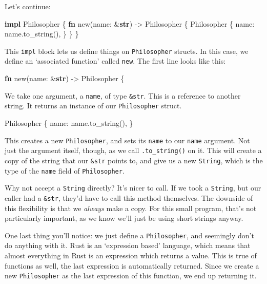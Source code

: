 \documentclass[a4paper,]{book}
\newenvironment{Shaded}{\begin{snugshade}}{\end{snugshade}}
\newcommand{\KeywordTok}[1]{\textcolor[rgb]{0.13,0.29,0.53}{\textbf{{#1}}}}
\newcommand{\NormalTok}[1]{{#1}}
\begin{document}
Let's continue:

\begin{Shaded}
\begin{Highlighting}[]
\KeywordTok{impl} \NormalTok{Philosopher \{}
    \KeywordTok{fn} \NormalTok{new(name: &}\KeywordTok{str}\NormalTok{) -> Philosopher \{}
        \NormalTok{Philosopher \{}
            \NormalTok{name: name.to_string(),}
        \NormalTok{\}}
    \NormalTok{\}}
\NormalTok{\}}
\end{Highlighting}
\end{Shaded}

This \texttt{impl} block lets us define things on \texttt{Philosopher}
structs. In this case, we define an `associated function' called
\texttt{new}. The first line looks like this:

\begin{Shaded}
\begin{Highlighting}[]
\KeywordTok{fn} \NormalTok{new(name: &}\KeywordTok{str}\NormalTok{) -> Philosopher \{}
\end{Highlighting}
\end{Shaded}

We take one argument, a \texttt{name}, of type \texttt{\&str}. This is a
reference to another string. It returns an instance of our
\texttt{Philosopher} struct.

\begin{Shaded}
\begin{Highlighting}[]
\NormalTok{Philosopher \{}
    \NormalTok{name: name.to_string(),}
\NormalTok{\}}
\end{Highlighting}
\end{Shaded}

This creates a new \texttt{Philosopher}, and sets its \texttt{name} to
our \texttt{name} argument. Not just the argument itself, though, as we
call \texttt{.to\_string()} on it. This will create a copy of the string
that our \texttt{\&str} points to, and give us a new \texttt{String},
which is the type of the \texttt{name} field of \texttt{Philosopher}.

Why not accept a \texttt{String} directly? It's nicer to call. If we
took a \texttt{String}, but our caller had a \texttt{\&str}, they'd have
to call this method themselves. The downside of this flexibility is that
we \emph{always} make a copy. For this small program, that's not
particularly important, as we know we'll just be using short strings
anyway.

One last thing you'll notice: we just define a \texttt{Philosopher}, and
seemingly don't do anything with it. Rust is an `expression based'
language, which means that almost everything in Rust is an expression
which returns a value. This is true of functions as well, the last
expression is automatically returned. Since we create a new
\texttt{Philosopher} as the last expression of this function, we end up
returning it.
\end{document}

